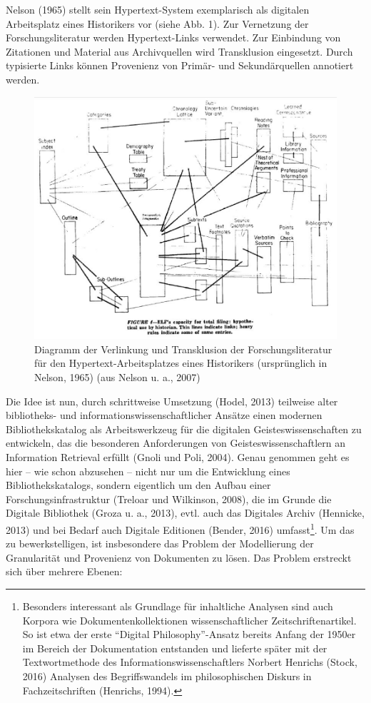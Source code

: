 \documentclass[a4paper,
fontsize=11pt,
oneside,
numbers=noperiodatend,
parskip=half-,
bibliography=totoc,
final
]{scrartcl}
\begin{document}
Nelson (1965) stellt sein Hypertext-System exemplarisch als digitalen
Arbeitsplatz eines Historikers vor (siehe Abb. 1). Zur Vernetzung der
Forschungsliteratur werden Hypertext-Links verwendet. Zur Einbindung von
Zitationen und Material aus Archivquellen wird Transklusion eingesetzt.
Durch typisierte Links können Provenienz von Primär- und Sekundärquellen
annotiert werden.

\begin{figure}
\centering
\includegraphics{img/abb1.png}
\caption{Diagramm der Verlinkung und Transklusion der
Forschungsliteratur für den Hypertext-Arbeitsplatzes eines Historikers
(ursprünglich in Nelson, 1965) (aus Nelson u. a., 2007)}
\end{figure}

Die Idee ist nun, durch schrittweise Umsetzung (Hodel, 2013) teilweise
alter bibliotheks- und informationswissenschaftlicher Ansätze einen
modernen Bibliothekskatalog als Arbeitswerkzeug für die digitalen
Geisteswissenschaften zu entwickeln, das die besonderen Anforderungen
von Geisteswissenschaftlern an Information Retrieval erfüllt (Gnoli und
Poli, 2004). Genau genommen geht es hier -- wie schon abzusehen -- nicht
nur um die Entwicklung eines Bibliothekskatalogs, sondern eigentlich um
den Aufbau einer Forschungsinfrastruktur (Treloar und Wilkinson, 2008),
die im Grunde die Digitale Bibliothek (Groza u. a., 2013), evtl. auch
das Digitales Archiv (Hennicke, 2013) und bei Bedarf auch Digitale
Editionen (Bender, 2016) umfasst\footnote{Besonders interessant als
  Grundlage für inhaltliche Analysen sind auch Korpora wie
  Dokumentenkollektionen wissenschaftlicher Zeitschriftenartikel. So ist
  etwa der erste \enquote{Digital Philosophy}-Ansatz bereits Anfang der
  1950er im Bereich der Dokumentation entstanden und lieferte später mit
  der Textwortmethode des Informationswissenschaftlers Norbert Henrichs
  (Stock, 2016) Analysen des Begriffswandels im philosophischen Diskurs
  in Fachzeitschriften (Henrichs, 1994).}. Um das zu bewerkstelligen,
ist insbesondere das Problem der Modellierung der Granularität und
Provenienz von Dokumenten zu lösen. Das Problem erstreckt sich über
mehrere Ebenen:
\end{document}
